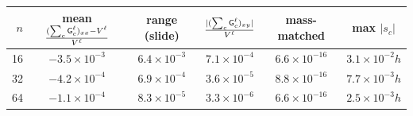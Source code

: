 \begin{center}\footnotesize
\setlength\tabcolsep{4pt}
\begin{tabular}{@{}rccccc@{}}
\toprule
$n$ & mean $\frac{(\sum_c\mathsf G^\ell_c)_{xx}-V^\ell}{V^\ell}$ & range (slide) &
$\frac{|(\sum_c\mathsf G^\ell_c)_{xy}|}{V^\ell}$ & mass-matched & max $|s_c|$\\
\midrule
16 & $-3.5\times10^{-3}$ & $6.4\times10^{-3}$ & $7.1\times10^{-4}$ & $6.6\times10^{-16}$ & $3.1\times10^{-2}h$\\
32 & $-4.2\times10^{-4}$ & $6.9\times10^{-4}$ & $3.6\times10^{-5}$ & $8.8\times10^{-16}$ & $7.7\times10^{-3}h$\\
64 & $-1.1\times10^{-4}$ & $8.3\times10^{-5}$ & $3.3\times10^{-6}$ & $6.6\times10^{-16}$ & $2.5\times10^{-3}h$\\
\bottomrule
\end{tabular}
\end{center}
